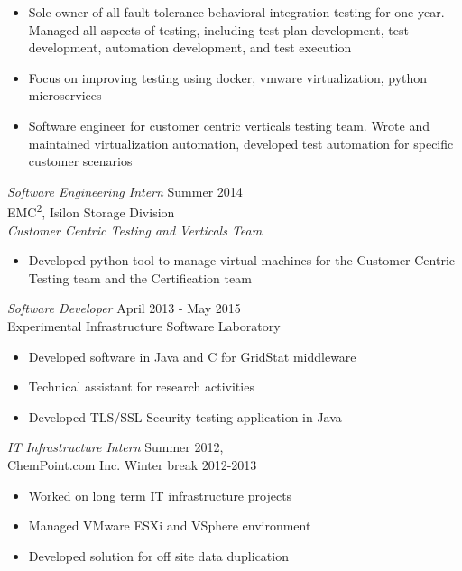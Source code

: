 \documentclass[line, margin]{res}
\begin{document}
\begin{resume}
\begin{itemize}
               \item Sole owner of all fault-tolerance behavioral integration testing for
                  one year. Managed all aspects of testing, including test plan
                       development, test development, automation development,
                       and test execution

                \item Focus on improving testing using docker, vmware virtualization,
                   python microservices

               \item Software engineer for customer centric verticals testing
                  team. Wrote and maintained virtualization automation, developed
                       test automation for specific customer scenarios
                \end{itemize}

                {\sl Software Engineering Intern} \hfill Summer 2014 \\
                EMC\textsuperscript{2}, Isilon Storage Division\\
                {\sl Customer Centric Testing and Verticals Team}
                 \begin{itemize}  \itemsep -2pt %
                 \item Developed python tool to manage virtual machines for the
                 Customer Centric Testing team and the Certification team
                \end{itemize}

                {\sl Software Developer} \hfill       April 2013 - May 2015 \\
                Experimental Infrastructure Software Laboratory
            \begin{itemize} \itemsep -2pt
                    \item Developed software in Java and C for GridStat middleware
                    \item Technical assistant for research activities
                    \item Developed TLS/SSL Security testing application in Java
                \end{itemize}
 
                {\sl IT Infrastructure Intern} \hfill           Summer 2012,\\
                ChemPoint.com Inc. \hfill Winter break 2012-2013
                 \begin{itemize}  \itemsep -2pt %
                 \item  Worked on long term IT infrastructure projects
                 \item  Managed VMware ESXi and VSphere environment
                 \item  Developed solution for off site data duplication
                 \end{itemize} 


\end{resume}
\end{document}
